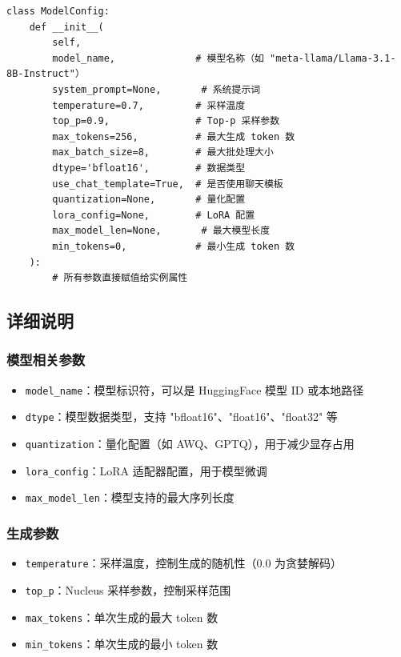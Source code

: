 \documentclass[12pt,a4paper]{article}
\begin{document}
\begin{lstlisting}
class ModelConfig:
    def __init__(
        self, 
        model_name,              # 模型名称（如 "meta-llama/Llama-3.1-8B-Instruct"）
        system_prompt=None,       # 系统提示词
        temperature=0.7,         # 采样温度
        top_p=0.9,               # Top-p 采样参数
        max_tokens=256,          # 最大生成 token 数
        max_batch_size=8,        # 最大批处理大小
        dtype='bfloat16',        # 数据类型
        use_chat_template=True,  # 是否使用聊天模板
        quantization=None,       # 量化配置
        lora_config=None,        # LoRA 配置
        max_model_len=None,       # 最大模型长度
        min_tokens=0,            # 最小生成 token 数
    ):
        # 所有参数直接赋值给实例属性
\end{lstlisting}

\subsection{详细说明}

\subsubsection{模型相关参数}
\begin{itemize}
    \item \texttt{model_name}：模型标识符，可以是 HuggingFace 模型 ID 或本地路径
    \item \texttt{dtype}：模型数据类型，支持 "bfloat16"、"float16"、"float32" 等
    \item \texttt{quantization}：量化配置（如 AWQ、GPTQ），用于减少显存占用
    \item \texttt{lora_config}：LoRA 适配器配置，用于模型微调
    \item \texttt{max_model_len}：模型支持的最大序列长度
\end{itemize}

\subsubsection{生成参数}
\begin{itemize}
    \item \texttt{temperature}：采样温度，控制生成的随机性（0.0 为贪婪解码）
    \item \texttt{top_p}：Nucleus 采样参数，控制采样范围
    \item \texttt{max_tokens}：单次生成的最大 token 数
    \item \texttt{min_tokens}：单次生成的最小 token 数
\end{itemize}
\end{document}
